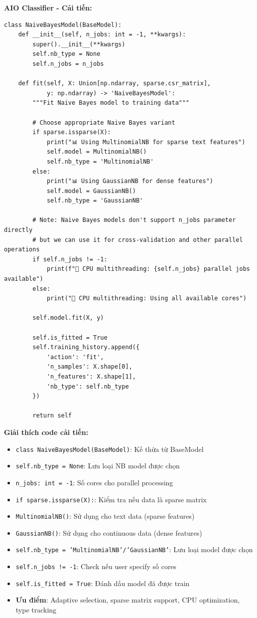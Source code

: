 \textbf{AIO Classifier - Cải tiến:}
\begin{verbatim}
class NaiveBayesModel(BaseModel):
    def __init__(self, n_jobs: int = -1, **kwargs):
        super().__init__(**kwargs)
        self.nb_type = None
        self.n_jobs = n_jobs
        
    def fit(self, X: Union[np.ndarray, sparse.csr_matrix], 
            y: np.ndarray) -> 'NaiveBayesModel':
        """Fit Naive Bayes model to training data"""
        
        # Choose appropriate Naive Bayes variant
        if sparse.issparse(X):
            print("📊 Using MultinomialNB for sparse text features")
            self.model = MultinomialNB()
            self.nb_type = 'MultinomialNB'
        else:
            print("📊 Using GaussianNB for dense features")
            self.model = GaussianNB()
            self.nb_type = 'GaussianNB'
        
        # Note: Naive Bayes models don't support n_jobs parameter directly
        # but we can use it for cross-validation and other parallel operations
        if self.n_jobs != -1:
            print(f"🔄 CPU multithreading: {self.n_jobs} parallel jobs available")
        else:
            print("🔄 CPU multithreading: Using all available cores")
        
        self.model.fit(X, y)
        
        self.is_fitted = True
        self.training_history.append({
            'action': 'fit',
            'n_samples': X.shape[0],
            'n_features': X.shape[1],
            'nb_type': self.nb_type
        })
        
        return self
\end{verbatim}

\textbf{Giải thích code cải tiến:}
\begin{itemize}
    \item \texttt{class NaiveBayesModel(BaseModel)}: Kế thừa từ BaseModel
    \item \texttt{self.nb\_type = None}: Lưu loại NB model được chọn
    \item \texttt{n\_jobs: int = -1}: Số cores cho parallel processing
    \item \texttt{if sparse.issparse(X):}: Kiểm tra nếu data là sparse matrix
    \item \texttt{MultinomialNB()}: Sử dụng cho text data (sparse features)
    \item \texttt{GaussianNB()}: Sử dụng cho continuous data (dense features)
    \item \texttt{self.nb\_type = 'MultinomialNB'/'GaussianNB'}: Lưu loại model được chọn
    \item \texttt{self.n\_jobs != -1}: Check nếu user specify số cores
    \item \texttt{self.is\_fitted = True}: Đánh dấu model đã được train
    \item \textbf{Ưu điểm}: Adaptive selection, sparse matrix support, CPU optimization, type tracking
\end{itemize}

